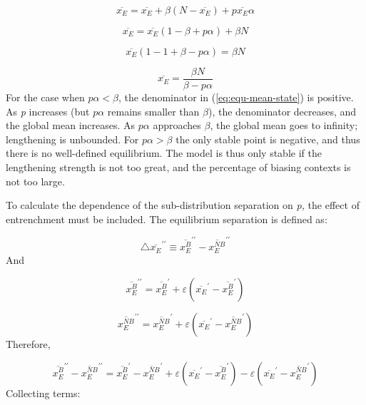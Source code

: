 \begin{equation}
\overline{x_{E}}=\overline{x_{E}}+\beta(N-\overline{x_{E}})+p\overline{x_{E}}\alpha
\end{equation}

\begin{equation}
\overline{x_{E}}=\overline{x_{E}}(1-\beta+p\alpha)+\beta N
\end{equation}

\begin{equation}
\overline{x_{E}}(1-1+\beta-p\alpha)=\beta N
\end{equation}

\begin{equation}
\overline{x_{E}}=\frac{\beta N}{\beta-p\alpha}\label{eq:equ-mean-state}
\end{equation}
For the case when $p\alpha<\beta$, the denominator in (\ref{eq:equ-mean-state})
is positive. As \emph{p} increases (but $p\alpha$ remains smaller
than $\beta$), the denominator decreases, and the global mean increases.
As $p\alpha$ approaches $\beta$, the global mean goes to infinity;
lengthening is unbounded. For $p\alpha>\beta$ the only stable point
is negative, and thus there is no well-defined equilibrium. The 
model is thus only stable if the lengthening strength is not too great,
and the percentage of biasing contexts is not too large. 

To calculate the dependence of the sub-distribution separation on
\emph{p,} the effect of entrenchment must be included. The equilibrium
separation is defined as: 

\begin{equation}
\triangle\overline{x_{E}}^{\prime\prime}\equiv\overline{x_{E}^{B}}^{\prime\prime}-\overline{x_{E}^{NB}}^{\prime\prime}
\end{equation}
And 

\begin{equation}
\overline{x_{E}^{B}}^{\prime\prime}=\overline{x_{E}^{B}}^{\prime}+\varepsilon(\overline{x_{E}}^{\prime}-\overline{x_{E}^{B}}^{\prime})
\end{equation}

\begin{equation}
\overline{x_{E}^{NB}}^{\prime\prime}=\overline{x_{E}^{NB}}^{\prime}+\varepsilon(\overline{x_{E}}^{\prime}-\overline{x_{E}^{NB}}^{\prime})
\end{equation}
Therefore, 

\begin{equation}
\overline{x_{E}^{B}}^{\prime\prime}-\overline{x_{E}^{NB}}^{\prime\prime}=\overline{x_{E}^{B}}^{\prime}-\overline{x_{E}^{NB}}^{\prime}+\varepsilon(\overline{x_{E}}^{\prime}-\overline{x_{E}^{B}}^{\prime})-\varepsilon(\overline{x_{E}}^{\prime}-\overline{x_{E}^{NB}}^{\prime})
\end{equation}
Collecting terms:

